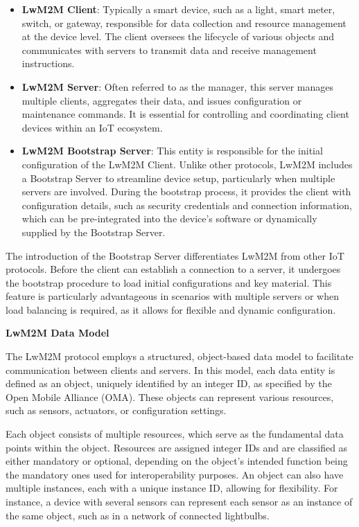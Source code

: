 \documentclass[11pt,sigconf]{iabart}
\begin{document}
\begin{itemize}
  \item \textbf{LwM2M Client}: Typically a smart device, such as a light, smart meter, switch, or gateway, responsible for data collection and resource management at the device level. The client oversees the lifecycle of various objects and communicates with servers to transmit data and receive management instructions.
  \item \textbf{LwM2M Server}: Often referred to as the manager, this server manages multiple clients, aggregates their data, and issues configuration or maintenance commands. It is essential for controlling and coordinating client devices within an IoT ecosystem.
  \item \textbf{LwM2M Bootstrap Server}: This entity is responsible for the initial configuration of the LwM2M Client. Unlike other protocols, LwM2M includes a Bootstrap Server to streamline device setup, particularly when multiple servers are involved. During the bootstrap process, it provides the client with configuration details, such as security credentials and connection information, which can be pre-integrated into the device's software or dynamically supplied by the Bootstrap Server.
\end{itemize}

The introduction of the Bootstrap Server differentiates LwM2M from other IoT protocols. Before the client can establish a connection to a server, it undergoes the bootstrap procedure to load initial configurations and key material. This feature is particularly advantageous in scenarios with multiple servers or when load balancing is required, as it allows for flexible and dynamic configuration.

\textbf{LwM2M Data Model}

The LwM2M protocol employs a structured, object-based data model to facilitate communication between clients and servers. In this model, each data entity is defined as an object, uniquely identified by an integer ID, as specified by the Open Mobile Alliance (OMA). These objects can represent various resources, such as sensors, actuators, or configuration settings.

Each object consists of multiple resources, which serve as the fundamental data points within the object. Resources are assigned integer IDs and are classified as either mandatory or optional, depending on the object's intended function being the mandatory ones used for interoperability purposes. An object can also have multiple instances, each with a unique instance ID, allowing for flexibility. For instance, a device with several sensors can represent each sensor as an instance of the same object, such as in a network of connected lightbulbs.
\end{document}
